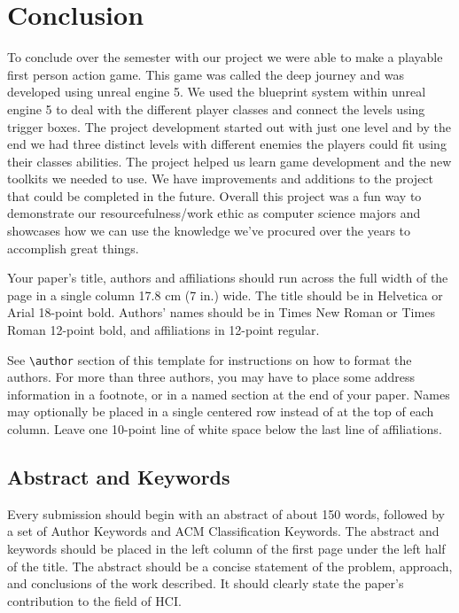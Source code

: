 \documentclass{sigchi}
\begin{document}
\section{Conclusion}
To conclude over the semester with our project we were able to make a playable first person action game. This game was called the deep journey and was developed using unreal engine 5. We used the blueprint system within unreal engine 5 to deal with the different player classes and connect the levels using trigger boxes. The project development started out with just one level and by the end we had three distinct levels with different enemies the players could fit using their classes abilities. The project helped us learn game development and the new toolkits we needed to use. We have improvements and additions to the project that could be completed in the future. Overall this project was a fun way to demonstrate our resourcefulness/work ethic as computer science majors and showcases how we can use the knowledge we've procured over the years to accomplish great things. 



Your paper's title, authors and affiliations should run across the
full width of the page in a single column 17.8 cm (7 in.) wide.  The
title should be in Helvetica or Arial 18-point bold.  Authors' names
should be in Times New Roman or Times Roman 12-point bold, and
affiliations in 12-point regular.  

See \texttt{{\textbackslash}author} section of this template for
instructions on how to format the authors. For more than three
authors, you may have to place some address information in a footnote,
or in a named section at the end of your paper. Names may optionally
be placed in a single centered row instead of at the top of each
column. Leave one 10-point line of white space below the last line of
affiliations.

\subsection{Abstract and Keywords}

Every submission should begin with an abstract of about 150 words,
followed by a set of Author Keywords and ACM Classification
Keywords. The abstract and keywords should be placed in the left
column of the first page under the left half of the title. The
abstract should be a concise statement of the problem, approach, and
conclusions of the work described. It should clearly state the paper's
contribution to the field of HCI\@.
\end{document}
